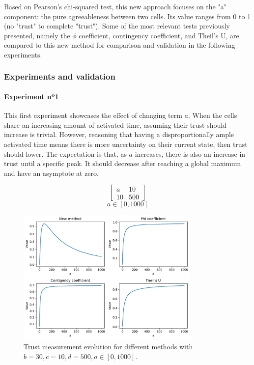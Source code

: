 Based on Pearson's chi-squared test, this new approach focuses on the "a" component: the pure agreeableness between two cells. Its value ranges from 0 to 1 (no "trust" to complete "trust"). Some of the most relevant tests previously presented, namely the $\phi$ coefficient, contingency coefficient, and Theil's U, are compared to this new method for comparison and validation in the following experiments.

\subsubsection{Experiments and validation}

\paragraph{Experiment nº1} This first experiment showcases the effect of changing term $a$. When the cells share an increasing amount of activated time, assuming their trust should increase is trivial. However, reasoning that having a disproportionally ample activated time means there is more uncertainty on their current state, then trust should lower. The expectation is that, as $a$ increases, there is also an increase in trust until a specific peak. It should decrease after reaching a global maximum and have an asymptote at zero.

$$
\begin{bmatrix}
    a & 10 \\ 10 & 500
\end{bmatrix}
$$
$$
a \in [0, 1000]
$$

\begin{figure}[h!]
\centering
    \includegraphics[width=0.8\textwidth]{figures/chapter4/cell/trust_tests/3.pdf}
    \caption{Trust measurement evolution for different methods with $b=30, c=10, d=500, a \in [0, 1000]$.}
    \label{fig:trust_test_3}
\end{figure}
\FloatBarrier

